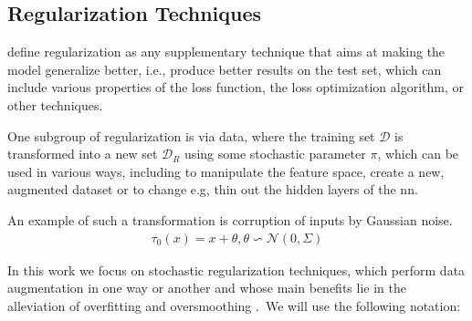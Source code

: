 \subsection{Regularization Techniques}
\label{sec:related:pred:regularization}

\citet{Kukacka2017} define regularization as any supplementary technique that aims at making the model generalize better, i.e., produce better results on the test set, which can include various properties of the loss function, the loss optimization algorithm, or other techniques.

One subgroup of regularization is via data, where the training set $\mathcal{D}$ is
transformed into a new set $\mathcal{D}_{R}$ using some stochastic parameter
$\pi$, which can be used in various ways, including to manipulate the feature space,
create a new, augmented dataset or to change e.g, thin out the hidden layers of
the \ac{nn}.

An example of such a transformation is corruption of inputs by Gaussian noise.
\begin{align*}
    \tau_{0}(x) = x + \theta, \theta \backsim \mathcal{N}(0, \Sigma)
\end{align*}

In this work we focus on stochastic regularization techniques, which perform
data augmentation in one way or another and whose main benefits lie in the alleviation
of overfitting and oversmoothing \cite{Hasanzadeh2020}.\
We will use the following notation: \

